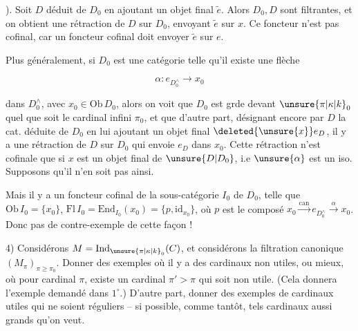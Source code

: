 
). Soit $D$ déduit de $D_0$ en ajoutant un objet final $\widetilde e$. Alors $D_0,D$ sont filtrantes, et on obtient une rétraction de $D$ sur $D_0$, envoyant $\widetilde e$ sur $x$. Ce foncteur n'est pas cofinal, car  un foncteur cofinal doit envoyer $\widetilde e$ sur $e$.

Plus généralement, si $D_0$ est une catégorie telle qu'il existe une flèche

{\makeatletter\tagsleft@true\makeatother
\[ \alpha:e_{D_0^{\wedge}}\longrightarrow x_0 \tag*{$(*)$} \]
}

dans $D_0^{\wedge}$, avec $x_0\in\mathrm{Ob}\,D_0$, alors on voit que $D_0$ est grde devant $\unsure{\pi|\kappa|k}_0$ quel que soit le cardinal infini $\pi_0$, et que d'autre part, désignant encore par $D$ la cat. déduite de $D_0$ en lui ajoutant un objet final  $\deleted{\unsure{x}}e_D$, il y a une rétraction de $D$ sur $D_0$ qui envoie $e_D$ dans $x_0$. Cette rétraction n'est cofinale que si $x$ est un objet final de $\unsure{D|D_0}$, i.e  $\unsure{\alpha}$ est un iso. Supposons qu'il n'en soit pas ainsi.


Mais il y a un foncteur cofinal de la sous-catégorie $I_0$ de $D_0$, telle que $\mathrm{Ob}\,I_0=\{x_0\}$, $\mathrm{Fl}\,I_0=\mathrm{End}_{I_0}(x_0)=\{p,\mathrm{id}_{x_0}\}$, où $p$ est le composé $x_0\xrightarrow{\mathrm{can}}e_{D_0^{\wedge}}\xrightarrow{\alpha}x_0$. Donc pas de contre-exemple de cette façon !

4) Considérons $M=\mathrm{Ind}_{\unsure{\pi|\kappa|k}_0}(C)$,   et considérons la filtration canonique $(M_\pi)_{\pi\geq\pi_0}$.  Donner des exemples  où il y a des cardinaux non utiles, ou mieux, où pour  cardinal $\pi$, existe un cardinal $\pi'>\pi$ qui soit non utile. (Cela donnera l'exemple demandé dans $1^\circ$.) D'autre part, donner des exemples de cardinaux utiles qui ne soient réguliers -- si possible, comme tantôt,  tels cardinaux aussi grands qu'on veut. \par\hfill\unsure{$\backslash$}\hfill\null

